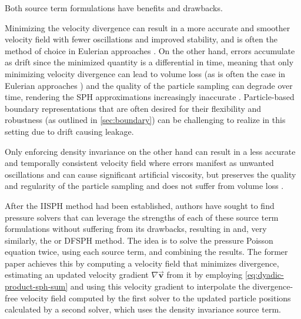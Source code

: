 \documentclass[oneside, a4paper]{book}
\newcommand\vek[1]{\vec{\bm{#1}}}
\begin{document}
    Both source term formulations have benefits and drawbacks. 
    
    Minimizing the velocity divergence can result in a more accurate and smoother velocity field with fewer oscillations and improved stability, and is often the method of choice in Eulerian approaches \autocite{dfsph}. On the other hand, errors accumulate as drift since the minimized quantity is a differential in time, meaning that only minimizing velocity divergence can lead to volume loss (as is often the case in Eulerian approaches \autocite{dfsph}) and the quality of the particle sampling can degrade over time, rendering the SPH approximations increasingly inaccurate \autocite{optimized-source-term}. Particle-based boundary representations that are often desired for their flexibility and robustness (as outlined in \autoref{sec:boundary}) can be challenging to realize in this setting due to drift causing leakage.

    Only enforcing density invariance on the other hand can result in a less accurate and temporally consistent velocity field where errors manifest as unwanted oscillations and can cause significant artificial viscosity, but preserves the quality and regularity of the particle sampling and does not suffer from volume loss \autocite{optimized-source-term}.
    
    After the IISPH method had been established, authors have sought to find pressure solvers that can leverage the strengths of each of these source term formulations without suffering from its drawbacks, resulting in \autocite[more optimized source term formulations]{optimized-source-term} and, very similarly, the \autocite[Divergence-Free SPH]{dfsph} or DFSPH method. The idea is to solve the pressure Poisson equation twice, using each source term, and combining the results. 
    The former paper achieves this by computing a velocity field that minimizes divergence, estimating an updated velocity gradient $\nabla\vek{v}$ from it by employing \autoref{eq:dyadic-product-sph-sum} and using this velocity gradient to interpolate the divergence-free velocity field computed by the first solver to the updated particle positions calculated by a second solver, which uses the density invariance source term. 
\end{document}
